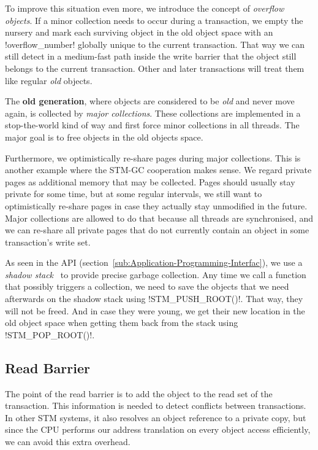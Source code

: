 \documentclass{sigplanconf}
\makeatletter
\renewcommand\lstinline[1][]{%
  \Collectverb{\@@myverb}%
}
\def\@@myverb#1{%
    \begingroup
    \fboxsep=0.2em
    \colorbox{verylightgray}{\oldlstinline|#1|}%
    \endgroup
}
\makeatother
\begin{document}
To improve this situation even more, we introduce the concept of
\emph{overflow objects}. If a minor collection needs to occur during a
transaction, we empty the nursery and mark each surviving object in
the old object space with an \lstinline!overflow_number!  globally
unique to the current transaction. That way we can still detect in a
medium-fast path inside the write barrier that the object still belongs to the
current transaction. Other and later transactions will treat them
like regular \emph{old} objects.

The \textbf{old generation}, where objects are considered to be
\emph{old} and never move again, is collected by \emph{major
  collections}.  These collections are implemented in a stop-the-world
kind of way and first force minor collections in all threads. The
major goal is to free objects in the old objects space.

Furthermore, we optimistically re-share pages during major collections.
This is another example where the STM-GC cooperation makes sense. We
regard private pages as additional memory that may be collected.
Pages should usually stay private for some time, but at some regular
intervals, we still want to optimistically re-share pages in case they actually
stay unmodified in the future. Major collections are allowed to do
that because all threads are synchronised, and we can re-share all
private pages that do not currently contain an object in some
transaction's  write set.

As seen in the API (section~\ref{sub:Application-Programming-Interfac}),
we use a \emph{shadow stack}~\cite{fergus02} to provide precise garbage
collection.  Any time we call a function that possibly triggers a
collection, we need to save the objects that we need afterwards on the
shadow stack using \lstinline!STM_PUSH_ROOT()!.  That way, they will
not be freed. And in case they were young, we get their new location
in the old object space when getting them back from the stack using
\lstinline!STM_POP_ROOT()!.




\subsection{Read Barrier}

The point of the read barrier is to add the object to the read set of
the transaction. This information is needed to detect conflicts
between transactions. In other STM systems, it also resolves an object reference to
a private copy, but since the CPU performs our address translation on
every object access efficiently, we can avoid this extra overhead.
\end{document}
